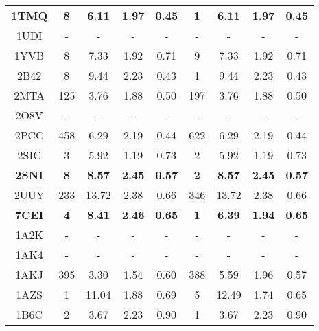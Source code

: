 \begin{longtable}{c c c c c|c c c c}
 \textbf{\tiny 1TMQ} &\textbf{\tiny 8}&\textbf{\tiny 6.11}&\textbf{\tiny 1.97}&\textbf{\tiny 0.45} &\textbf{\tiny 1}&\textbf{\tiny 6.11}&\textbf{\tiny 1.97}&\textbf{\tiny 0.45}\\ 
 {\tiny 1UDI} &{\tiny -}&{\tiny -}&{\tiny -}&{\tiny -} &{\tiny -}&{\tiny -}&{\tiny -}&{\tiny -}\\ 
 {\tiny 1YVB} &{\tiny 8}&{\tiny 7.33}&{\tiny 1.92}&{\tiny 0.71} &{\tiny 9}&{\tiny 7.33}&{\tiny 1.92}&{\tiny 0.71}\\ 
 {\tiny 2B42} &{\tiny 8}&{\tiny 9.44}&{\tiny 2.23}&{\tiny 0.43} &{\tiny 1}&{\tiny 9.44}&{\tiny 2.23}&{\tiny 0.43}\\ 
 {\tiny 2MTA} &{\tiny 125}&{\tiny 3.76}&{\tiny 1.88}&{\tiny 0.50} &{\tiny 197}&{\tiny 3.76}&{\tiny 1.88}&{\tiny 0.50}\\ 
 {\tiny 2O8V} &{\tiny -}&{\tiny -}&{\tiny -}&{\tiny -} &{\tiny -}&{\tiny -}&{\tiny -}&{\tiny -}\\ 
 {\tiny 2PCC} &{\tiny 458}&{\tiny 6.29}&{\tiny 2.19}&{\tiny 0.44} &{\tiny 622}&{\tiny 6.29}&{\tiny 2.19}&{\tiny 0.44}\\ 
 {\tiny 2SIC} &{\tiny 3}&{\tiny 5.92}&{\tiny 1.19}&{\tiny 0.73} &{\tiny 2}&{\tiny 5.92}&{\tiny 1.19}&{\tiny 0.73}\\ 
 \textbf{\tiny 2SNI} &\textbf{\tiny 8}&\textbf{\tiny 8.57}&\textbf{\tiny 2.45}&\textbf{\tiny 0.57} &\textbf{\tiny 2}&\textbf{\tiny 8.57}&\textbf{\tiny 2.45}&\textbf{\tiny 0.57}\\ 
 {\tiny 2UUY} &{\tiny 233}&{\tiny 13.72}&{\tiny 2.38}&{\tiny 0.66} &{\tiny 346}&{\tiny 13.72}&{\tiny 2.38}&{\tiny 0.66}\\ 
 \textbf{\tiny 7CEI} &\textbf{\tiny 4}&\textbf{\tiny 8.41}&\textbf{\tiny 2.46}&\textbf{\tiny 0.65} &\textbf{\tiny 1}&\textbf{\tiny 6.39}&\textbf{\tiny 1.94}&\textbf{\tiny 0.65}\\ 
 {\tiny 1A2K} &{\tiny -}&{\tiny -}&{\tiny -}&{\tiny -} &{\tiny -}&{\tiny -}&{\tiny -}&{\tiny -}\\ 
 {\tiny 1AK4} &{\tiny -}&{\tiny -}&{\tiny -}&{\tiny -} &{\tiny -}&{\tiny -}&{\tiny -}&{\tiny -}\\ 
 {\tiny 1AKJ} &{\tiny 395}&{\tiny 3.30}&{\tiny 1.54}&{\tiny 0.60} &{\tiny 388}&{\tiny 5.59}&{\tiny 1.96}&{\tiny 0.57}\\ 
 {\tiny 1AZS} &{\tiny 1}&{\tiny 11.04}&{\tiny 1.88}&{\tiny 0.69} &{\tiny 5}&{\tiny 12.49}&{\tiny 1.74}&{\tiny 0.65}\\ 
 {\tiny 1B6C} &{\tiny 2}&{\tiny 3.67}&{\tiny 2.23}&{\tiny 0.90} &{\tiny 1}&{\tiny 3.67}&{\tiny 2.23}&{\tiny 0.90}\\ 

\end{longtable}
